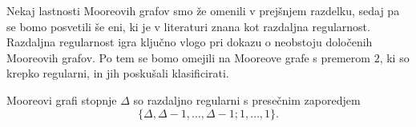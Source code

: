 \documentclass[fin1, tisk]{fmfdelo}
\begin{document}







Nekaj lastnosti Mooreovih grafov smo že omenili v prejšnjem razdelku, sedaj 
pa se bomo posvetili še eni, ki je v literaturi znana kot razdaljna regularnost.
Razdaljna regularnost igra ključno vlogo pri dokazu o neobstoju določenih Mooreovih grafov.
Po tem se bomo omejili na Mooreove grafe s premerom $2$, ki so krepko regularni, in jih poskušali klasificirati.


\begin{trditev}\label{tr:moore_razdaljno_regularen}
    Mooreovi grafi stopnje $\Delta$ so razdaljno regularni s presečnim zaporedjem 
    $$\{\Delta, \Delta-1, \ldots, \Delta-1; 1, \ldots, 1\}.$$
\end{trditev}
\end{document}
